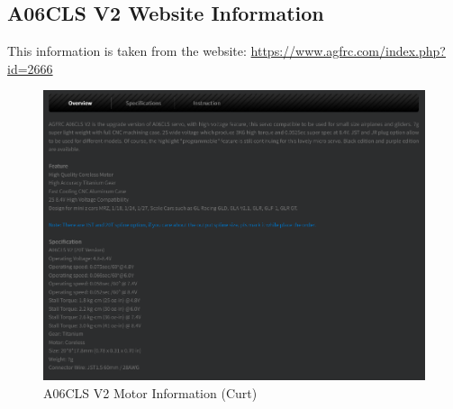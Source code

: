 \subsection{A06CLS V2 Website Information}
This information is taken from the website: \url{https://www.agfrc.com/index.php?id=2666}
\label{appendix:A06CLS_V2_website_information}
\begin{figure}[H]
    \centering
    \includegraphics[width=\textwidth]{Images/A06_motor_info_curt.png}
    \caption{A06CLS V2 Motor Information (Curt)}
    \label{fig:A06CLS_V2_motor_info_curt}
\end{figure}

